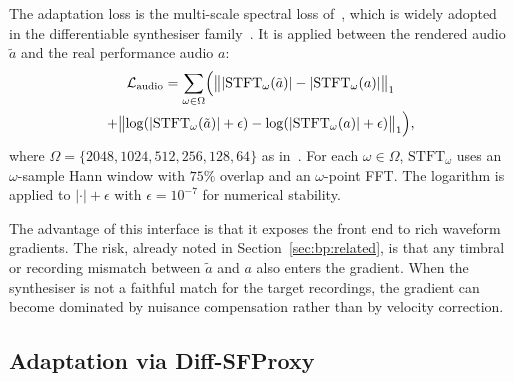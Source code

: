 The adaptation loss is the multi-scale spectral loss of~\cite{engel2020ddsp}, which is widely adopted in the differentiable synthesiser family~\cite{renault2023ddsp_piano, jonason2024guitar, wu2022mididdsp}. It is applied between the rendered audio $\tilde{a}$ and the real performance audio $a$:
\begin{multline}
\label{eq:bp_audio_loss}
\mathcal{L}_{\mathrm{audio}}
= \sum_{\omega \in \Omega} \Bigl(
\bigl\lVert \lvert\mathrm{STFT}_{\omega}(\tilde{a})\rvert - \lvert\mathrm{STFT}_{\omega}(a)\rvert \bigr\rVert_1 \\
+ \bigl\lVert \log(\lvert\mathrm{STFT}_{\omega}(\tilde{a})\rvert+\epsilon) - \log(\lvert\mathrm{STFT}_{\omega}(a)\rvert+\epsilon) \bigr\rVert_1
\Bigr),
\end{multline}
where $\Omega = \{2048, 1024, 512, 256, 128, 64\}$ as in~\cite{engel2020ddsp}. For each $\omega \in \Omega$, $\mathrm{STFT}_{\omega}$ uses an $\omega$-sample Hann window with $75\%$ overlap and an $\omega$-point FFT. The logarithm is applied to $\lvert\cdot\rvert + \epsilon$ with $\epsilon = 10^{-7}$ for numerical stability.

The advantage of this interface is that it exposes the front end to rich waveform gradients. The risk, already noted in Section~\ref{sec:bp:related}, is that any timbral or recording mismatch between $\tilde{a}$ and $a$ also enters the gradient. When the synthesiser is not a faithful match for the target recordings, the gradient can become dominated by nuisance compensation rather than by velocity correction.

\subsection{Adaptation via Diff-SFProxy}
\label{ssec:bp:adapt_diffsfproxy}

